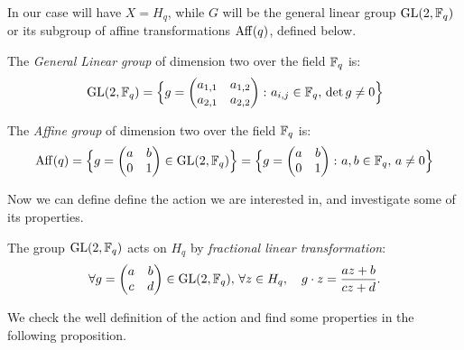 In our case will have $X=H_q$, while $G$ will be the general linear group $\operatorname{GL}(2,{\mathbb F}_q)$ or its subgroup of
affine transformations $\operatorname{Aff} (q)$, defined below.
\begin{defn}
	The {\it General Linear group} of dimension two over the field ${\mathbb F}_q$ is:
	\begin{equation*}
	\operatorname{GL}(2,{\mathbb F}_q)=\Big\{ g=\begin{pmatrix} a_{1,1} & a_{1,2} \\ a_{2,1} & a_{2,2} \end{pmatrix} \colon a_{i,j} \in {\mathbb F}_q,\, \det g \neq 0 \Big\}
	\end{equation*}	
\end{defn}
\begin{defn}
	The {\it Affine group} of dimension two over the field ${\mathbb F}_q$ is:
	\begin{equation*}
	\operatorname{Aff} (q)=\Big\{ g=\begin{pmatrix} a & b \\ 0 & 1 \end{pmatrix}\in \operatorname{GL}(2,{\mathbb F}_q) \Big\}=\Big\{ g=\begin{pmatrix} a & b \\ 0 & 1 \end{pmatrix} \colon a,b \in {\mathbb F}_q, \, a \neq 0 \Big \}
	\end{equation*}
\end{defn}
Now we can define define the action we are interested in, and investigate some of its properties.
\begin{defn}\label{flt}
The group $\operatorname{GL}(2,{\mathbb F}_q)$ acts on $H_q$ by {\it fractional linear transformation}:
\begin{equation}
	\forall g= \begin{pmatrix} a & b \\ c & d \end{pmatrix}\in \operatorname{GL}(2,{\mathbb F}_q),\, \forall z \in H_q, \quad g \cdot z = \frac{az+b}{cz+d}.
\end{equation}
\end{defn}

We check the well definition of the action and find some properties in the following proposition.

